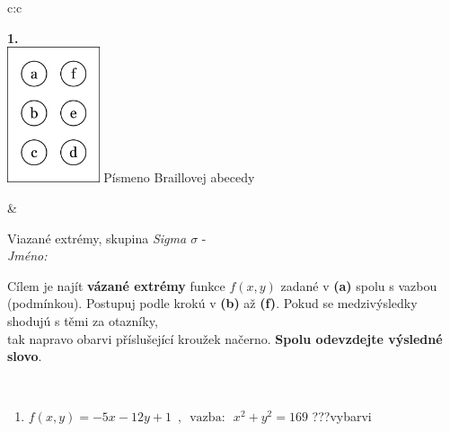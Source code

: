 \documentclass[10pt]{report}
\begin{document}
\begin{tabular}{c:c}
\begin{minipage}[c][104.5mm][t]{0.5\linewidth}
\begin{center}
\begin{minipage}{0.79\linewidth}
\begin{center}
\begin{varwidth}{\linewidth}
\begin{enumerate}
\end{enumerate}
\end{varwidth}
\end{center}
\end{minipage}
\begin{minipage}{0.20\linewidth}
\begin{center}
{\Huge\bfseries 1.} \\[2mm]
\includegraphics[height=40mm]{../images/braille.png}
{\small Písmeno Braillovej abecedy}
\end{center}
\end{minipage}
\end{center}
\end{minipage}
&
\begin{minipage}[c][104.5mm][t]{0.5\linewidth}
\begin{center}
\vspace{7mm}
{\huge Viazané extrémy, skupina \textit{Sigma $\sigma$} -}\\[5mm]
\textit{Jméno:}\phantom{xxxxxxxxxxxxxxxxxxxxxxxxxxxxxxxxxxxxxxxxxxxxxxxxxxxxxxxxxxxxxxxxx}\\[5mm]
\begin{minipage}{0.95\linewidth}
\begin{center}
Cílem je najít \textbf{vázané extrémy} funkce $f(x,y)$ zadané v \textbf{(a)} spolu s vazbou (podmínkou). Postupuj podle krokú v \textbf{(b)} až \textbf{(f)}. Pokud se medzivýsledky shodujú s těmi za otazníky,\\tak napravo obarvi příslušející kroužek načerno. \textbf{Spolu odevzdejte výsledné slovo}.
\end{center}
\end{minipage}
\\[1mm]
\begin{minipage}{0.79\linewidth}
\begin{center}
\begin{varwidth}{\linewidth}
\begin{enumerate}
\normalsize
\item $f(x,y)=-5x-12y+1 \enspace , \enspace \mathrm{vazba:} \enspace x^2+y^2=169$\quad \dotfill\; ???\;\dotfill \quad vybarvi

\end{enumerate}
\end{varwidth}
\end{center}
\end{minipage}
\end{center}
\end{minipage}
\end{tabular}
\end{document}
